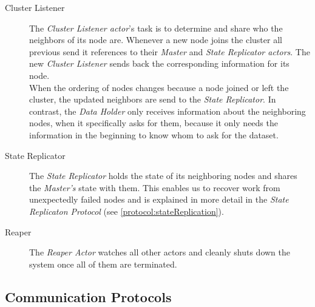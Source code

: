 \begin{description}
  \item[Cluster Listener]
  The \emph{Cluster Listener actor}'s task is to determine and share who the neighbors of its node are.
  Whenever a new node joins the cluster all previous send it references to their \emph{Master} and \emph{State Replicator actors}.
  The new \emph{Cluster Listener} sends back the corresponding information for its node. \\
  When the ordering of nodes changes because a node joined or left the cluster, the updated neighbors are send to the \emph{State Replicator}.
  In contrast, the \emph{Data Holder} only receives information about the neighboring nodes, when it specifically asks for them, because it only needs the information in the beginning to know whom to ask for the dataset.
  
  \item[State Replicator]
  The \emph{State Replicator} holds the state of its neighboring nodes and shares the \emph{Master's} state with them.
  This enables us to recover work from unexpectedly failed nodes and is explained in more detail in the \emph{State Replicaton Protocol} (see \cref{protocol:stateReplication}).
  
  \item[Reaper] 
  The \emph{Reaper Actor} watches all other actors and cleanly shuts down the system once all of them are terminated.
\end{description}

\subsection{Communication Protocols}\label{sec:protocols}

